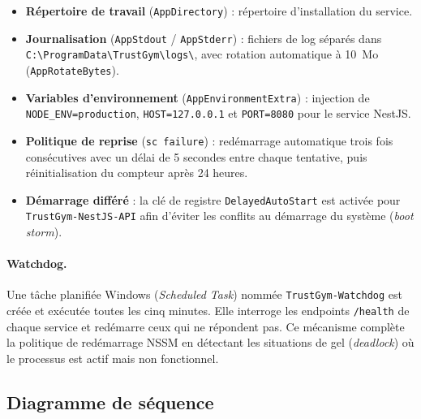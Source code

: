 ﻿\documentclass[../main.tex]{subfiles}
\begin{document}
\begin{itemize}
  \item \textbf{R\'{e}pertoire de travail} (\texttt{AppDirectory}) : r\'{e}pertoire d'installation du service.
  \item \begin{sloppypar}\textbf{Journalisation} (\texttt{AppStdout} / \texttt{AppStderr}) : fichiers de log s\'{e}par\'{e}s dans \texttt{C:\textbackslash{}ProgramData\textbackslash{}TrustGym\textbackslash{}logs\textbackslash{}}, avec rotation automatique \`{a} 10~Mo (\texttt{AppRotateBytes}).\end{sloppypar}
  \item \begin{sloppypar}\textbf{Variables d'environnement} (\texttt{AppEnvironmentExtra}) : injection de \texttt{NODE\_ENV=production}, \texttt{HOST=127.0.0.1} et \texttt{PORT=8080} pour le service NestJS.\end{sloppypar}
  \item \textbf{Politique de reprise} (\texttt{sc failure}) : red\'{e}marrage automatique trois fois cons\'{e}cutives avec un d\'{e}lai de 5 secondes entre chaque tentative, puis r\'{e}initialisation du compteur apr\`{e}s 24 heures.
  \item \begin{sloppypar}\textbf{D\'{e}marrage diff\'{e}r\'{e}} : la cl\'{e} de registre \texttt{DelayedAutoStart} est activ\'{e}e pour \texttt{TrustGym-NestJS-API} afin d'\'{e}viter les conflits au d\'{e}marrage du syst\`{e}me (\textit{boot storm}).\end{sloppypar}
\end{itemize}

\paragraph{Watchdog.}
\begin{sloppypar}
Une t\^{a}che planifi\'{e}e Windows (\textit{Scheduled Task}) nomm\'{e}e \texttt{TrustGym-Watchdog} est cr\'{e}\'{e}e et ex\'{e}cut\'{e}e toutes les cinq minutes. Elle interroge les endpoints \texttt{/health} de chaque service et red\'{e}marre ceux qui ne r\'{e}pondent pas. Ce m\'{e}canisme compl\`{e}te la politique de red\'{e}marrage NSSM en d\'{e}tectant les situations de gel (\textit{deadlock}) o\`{u} le processus est actif mais non fonctionnel.
\end{sloppypar}

\subsection{Diagramme de s\'{e}quence}
\end{document}
